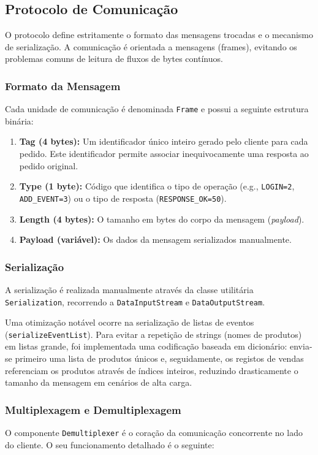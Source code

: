 \documentclass{article}
\begin{document}
\subsection{Protocolo de Comunicação}

O protocolo define estritamente o formato das mensagens trocadas e o mecanismo de serialização. A comunicação é orientada a mensagens (frames), evitando os problemas comuns de leitura de fluxos de bytes contínuos.

\subsubsection{Formato da Mensagem}
Cada unidade de comunicação é denominada \texttt{Frame} e possui a seguinte estrutura binária:
\begin{enumerate}
    \item \textbf{Tag (4 bytes):} Um identificador único inteiro gerado pelo cliente para cada pedido. Este identificador permite associar inequivocamente uma resposta ao pedido original.
    \item \textbf{Type (1 byte):} Código que identifica o tipo de operação (e.g., \texttt{LOGIN=2}, \texttt{ADD\_EVENT=3}) ou o tipo de resposta (\texttt{RESPONSE\_OK=50}).
    \item \textbf{Length (4 bytes):} O tamanho em bytes do corpo da mensagem (\textit{payload}).
    \item \textbf{Payload (variável):} Os dados da mensagem serializados manualmente.
\end{enumerate}

\subsubsection{Serialização}
A serialização é realizada manualmente através da classe utilitária \texttt{Serialization}, recorrendo a \texttt{DataInputStream} e \texttt{DataOutputStream}.

Uma otimização notável ocorre na serialização de listas de eventos (\texttt{serializeEventList}). Para evitar a repetição de strings (nomes de produtos) em listas grande, foi implementada uma codificação baseada em dicionário: envia-se primeiro uma lista de produtos únicos e, seguidamente, os registos de vendas referenciam os produtos através de índices inteiros, reduzindo drasticamente o tamanho da mensagem em cenários de alta carga.

\subsubsection{Multiplexagem e Demultiplexagem}
O componente \texttt{Demultiplexer} é o coração da comunicação concorrente no lado do cliente. O seu funcionamento detalhado é o seguinte:
\end{document}

